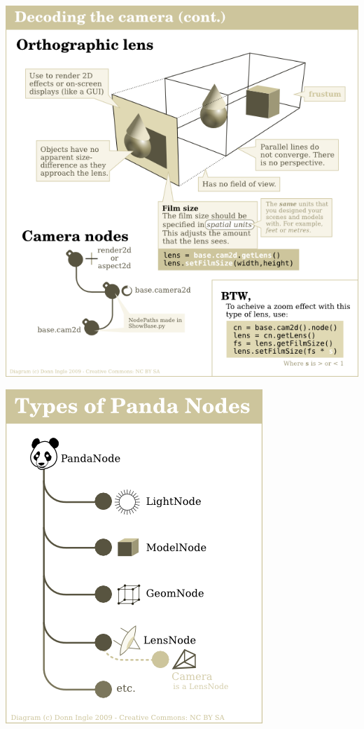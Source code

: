 \documentclass[a4paper,10pt]{book}
\begin{document}
\begin{center}
\includegraphics[scale=0.8]{Orthographic.png} 
\end{center}

\begin{center}
\includegraphics[scale=0.8]{PandaNodes.png} 
\end{center}
\end{document}
